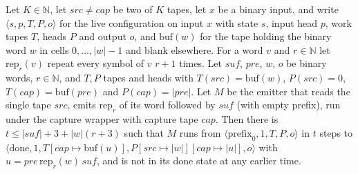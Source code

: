 \begin{theorem}
\label{Turing.NTimeDiag.dz_emit_run}
\leanok
{}
Let $K \in \mathbb{N}$, let $\mathit{src} \ne \mathit{cap}$ be two of $K$ tapes, let $x$ be a binary input, and write $\langle s, p, T, P, o\rangle$ for the live configuration on input $x$ with state $s$, input head $p$, work tapes $T$, heads $P$ and output $o$, and $\mathrm{buf}(w)$ for the tape holding the binary word $w$ in cells $0, \dots, |w| - 1$ and blank elsewhere. For a word $v$ and $r \in \mathbb{N}$ let $\mathrm{rep}_r(v)$ repeat every symbol of $v$ $r + 1$ times. Let $\mathit{suf}$, $\mathit{pre}$, $w$, $o$ be binary words, $r \in \mathbb{N}$, and $T, P$ tapes and heads with $T(\mathit{src}) = \mathrm{buf}(w)$, $P(\mathit{src}) = 0$, $T(\mathit{cap}) = \mathrm{buf}(\mathit{pre})$ and $P(\mathit{cap}) = |\mathit{pre}|$. Let $M$ be the emitter that reads the single tape $\mathit{src}$, emits $\mathrm{rep}_r$ of its word followed by $\mathit{suf}$ (with empty prefix), run under the capture wrapper with capture tape $\mathit{cap}$. Then there is $t \le |\mathit{suf}| + 3 + |w|(r + 3)$ such that $M$ runs from $\langle \text{prefix}_0, 1, T, P, o\rangle$ in $t$ steps to $\langle \text{done}, 1, T[\mathit{cap} \mapsto \mathrm{buf}(u)], P[\mathit{src} \mapsto |w|][\mathit{cap} \mapsto |u|], o\rangle$ with $u = \mathit{pre}\,\mathrm{rep}_r(w)\,\mathit{suf}$, and is not in its done state at any earlier time.
\end{theorem}

